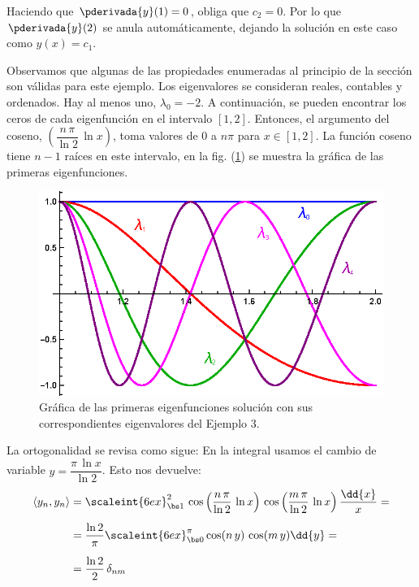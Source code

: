 \begin{ejemplo}
Haciendo que $\pderivada{y} (1) = 0$, obliga que $c_{2} = 0$. Por lo que $\pderivada{y} (2)$ se anula automáticamente, dejando la solución en este caso como $y(x) = c_{1}$.
\par
Observamos que algunas de las propiedades enumeradas al principio de la sección son válidas para este ejemplo. Los eigenvalores se consideran reales, contables y ordenados. Hay al menos uno, $\lambda_{0} = -2$. A continuación, se pueden encontrar los ceros de cada eigenfunción en el intervalo $[1, 2]$. Entonces, el argumento del coseno, $\left( \dfrac{n \, \pi}{\ln 2} \, \ln x \right)$, toma valores de $0$ a $n \pi$ para $x \in [1, 2]$. La función coseno tiene $n - 1$ raíces en este intervalo, en la fig. (\ref{fig:figura_04_02}) se muestra la gráfica de las primeras eigenfunciones.
\begin{figure}[H]
    \centering
    \includegraphics[scale=1.3]{Imagenes/Plot_Ejercicio_SL_03.eps}
    \caption{Gráfica de las primeras eigenfunciones solución con sus correspondientes eigenvalores del Ejemplo 3.}
    \label{fig:figura_04_02}
\end{figure}
La ortogonalidad se revisa como sigue: En la integral usamos el cambio de variable $y = \dfrac{\pi \, \ln x}{\ln 2}$. Esto nos devuelve:
\begin{align}
\begin{aligned}[b]
\langle y_{n}, y_{n} \rangle &= \scaleint{6ex}_{\bs 1}^{2} \, \cos \left( \dfrac{n \, \pi}{\ln 2} \, \ln x \right) \, \cos \left( \dfrac{m \, \pi}{\ln 2} \, \ln x \right) \dfrac{\dd{x}}{x} = \\[0.5em]
&= \dfrac{\ln 2}{\pi} \scaleint{6ex}_{\bs 0}^{\pi} \cos (n \, y) \, \cos (m \, y) \dd{y} = \\[0.5em]
&= \dfrac{\ln 2}{2} \, \delta_{nm}
\end{aligned}
\label{eq:ecuacion_04_16}
\end{align}
\end{ejemplo}

